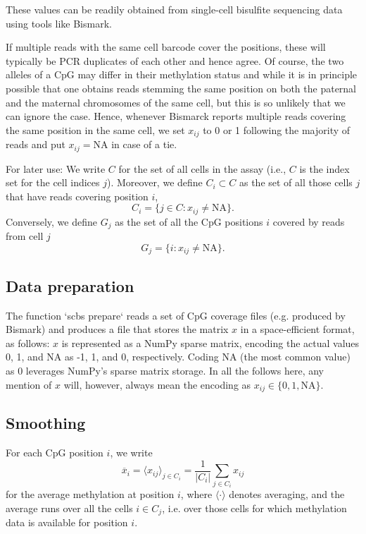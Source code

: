 \documentclass[twocolumn,10pt]{article}
\begin{document}
These values can be readily obtained from single-cell bisulfite sequencing data using tools like Bismark.

If multiple reads with the same cell barcode cover the positions, these will typically be PCR duplicates of each other and hence agree. Of course, the two alleles of a CpG may differ in their methylation status and while it is in principle possible that one obtains reads stemming the same position on both the paternal and the maternal chromosomes of the same cell, but this is so unlikely that we can ignore the case. Hence, whenever Bismarck reports multiple reads covering the same position in the same cell, we set $x_{ij}$ to 0 or 1 following the majority of reads and put $x_{ij}=\text{NA}$ in case of a tie. 

For later use: We write $C$ for the set of all cells in the assay (i.e., $C$ is the index set for the cell indices $j$). Moreover,
we define $C_i\subset C$ as the set of all those cells $j$ that have reads covering position $i$,
$$ C_i=\{j\in C: x_{ij}\neq\text{NA}\}.$$
Conversely, we define $G_j$ as the set of all the CpG positions $i$ covered by reads from cell $j$ 
$$ G_j=\{i: x_{ij}\neq\text{NA}\}.$$

\subsection{Data preparation}

The function `scbs prepare` reads a set of CpG coverage files (e.g. produced by Bismark) and produces a file that stores the matrix $x$ in a space-efficient format, as follows: $x$ is represented as a NumPy sparse matrix, encoding the actual values 0, 1, and NA as -1, 1, and 0, respectively. Coding NA (the most common value) as 0 leverages NumPy's sparse matrix storage. In all the follows here, any mention of $x$ will, however, always mean the encoding as $x_{ij}\in\{0,1,\text{NA}\}$.

\subsection{Smoothing}

For each CpG position $i$, we write 
$$\overline{x}_i=\langle x_{ij} \rangle_{j\in C_i} = \frac{1}{|C_i|}\sum_{j\in C_i} x_{ij}$$ 
for the average methylation at position $i$, where $\langle\cdot\rangle$ denotes averaging, and the average runs over all the cells $i\in C_j$, i.e. over those cells for which methylation data is available for position $i$.
\end{document}
